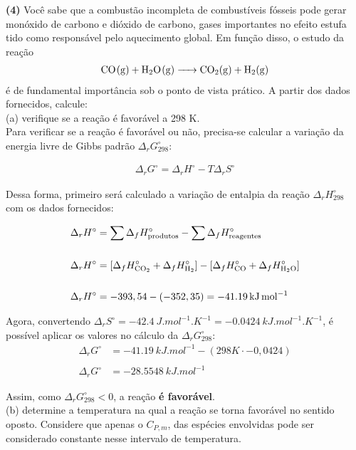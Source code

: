 \textbf{(4)} Você sabe que a combustão incompleta de combustíveis fósseis
pode gerar monóxido de carbono e dióxido de carbono, gases importantes no efeito
estufa tido como responsável pelo aquecimento global. Em função disso, o estudo
da reação
\begin{align*}
    \ce{CO(g) + H2O(g) -> CO2(g) + H2(g)}
\end{align*}
é de fundamental importância sob o ponto de vista prático. A partir dos dados fornecidos,
calcule:\\

(a) verifique se a reação é favorável a 298 K.\\

Para verificar se a reação é favorável ou não, precisa-se calcular a variação da energia livre de Gibbs padrão \( \Delta_rG^\circ_{298}\):

\begin{align*}
	\Delta_rG^\circ = \Delta_rH^\circ - T \Delta_rS^\circ
\end{align*}

Dessa forma, primeiro será calculado a variação de entalpia da reação \( \Delta_rH^\circ_{298}\) com os dados fornecidos:

\begin{align*}
    \Delta_rH^\circ &= \sum\Delta_fH^\circ_{\text{produtos}} -
    \sum\Delta_fH^\circ_{\text{reagentes}}\\ \\
    \Delta_rH^\circ &= [\Delta_fH^\circ_{\ce{CO2}} + \Delta_fH^\circ_{\ce{H2}}]
    - [ \Delta_fH^\circ_{\ce{CO}} + \Delta_fH^\circ_{\ce{H2O}}]\\ \\
	\Delta_rH^\circ &= -393,54 - (-352,35) = \qty{-41,19}{kJ . mol^{-1}}
\end{align*}

Agora, convertendo \(\Delta_rS^\circ = \qty{-42,4}{J . mol^{-1} . K^{-1}} =
\qty{-0,0424}{kJ . mol^{-1} . K^{-1}}\), é possível aplicar os valores no cálculo da \(\Delta_rG^\circ_{298}\):
\begin{align*}
	\Delta_rG^\circ &= \qty{-41,19}{kJ.mol^{-1}} - (298K \cdot -0,0424) \\ \\
	\Delta_rG^\circ &= \qty{-28,5548}{kJ.mol^{-1}}
\end{align*}

Assim, como \(\Delta_rG^\circ_{298} < 0\), a reação \textbf{é favorável}. \\ 
 
(b) determine a temperatura na qual a reação se torna favorável no sentido 
oposto. Considere que apenas o \(C_{P,m}\), das espécies envolvidas pode ser
considerado constante nesse intervalo de temperatura.\\

